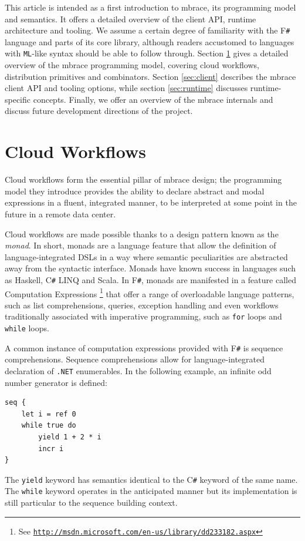 \documentclass[9pt,a4paper]{article}
\newcommand{\mbrace}{mbrace}
\newcommand{\fsharp}{F\texttt \#}
\newcommand{\csharp}{C\texttt \#}
\newcommand{\dotnet}{\texttt{\hbox{.}NET}}
\newcommand{\samehref}[1]{\href{#1}{\texttt{#1}}}
\begin{document}
This article is intended as a first introduction to \mbrace{}, its programming model and semantics.
It offers a detailed overview of the client API, runtime architecture and tooling.
We assume a certain degree of familiarity with the \fsharp{} language and parts
of its core library, although readers accustomed to languages with \texttt{ML}-like syntax
should be able to follow through.
Section \ref{sec:workflows} gives a detailed overview of the \mbrace{} programming model,
covering cloud workflows, distribution primitives and combinators.
Section \ref{sec:client} describes the \mbrace{} client API and tooling options,
while section \ref{sec:runtime} discusses runtime-specific concepts.
Finally, we offer an overview of the \mbrace{} internals and discuss future
development directions of the project.
%


%
%

\section{Cloud Workflows}%
\label{sec:workflows}
%
Cloud workflows form the essential pillar of \mbrace{} design;
the programming model they introduce provides the ability to declare abstract
and modal expressions in a fluent, integrated manner, to be interpreted 
at some point in the future in a remote data center.

Cloud workflows are made possible thanks to a design pattern known as the \emph{monad}.
In short, monads are a language feature that allow the definition of language-integrated 
DSLs in a way where semantic peculiarities are abstracted away from the syntactic interface.
Monads have known success in languages such as Haskell, \csharp{} LINQ and Scala. 
In \fsharp, monads are manifested in a feature called 
Computation Expressions%
\footnote{See \samehref{http://msdn.microsoft.com/en-us/library/dd233182.aspx}}
that offer a range of overloadable language patterns, such as list comprehensions, 
queries, exception handling and even workflows traditionally associated with 
imperative programming, such as \texttt{for} loops and \texttt{while} loops.

A common instance of computation expressions provided with \fsharp{} is 
sequence comprehensions. Sequence comprehensions allow for language-integrated declaration 
of \dotnet{} enumerables. In the following example, an infinite odd number generator is 
defined:
\begin{lstlisting}
seq {
    let i = ref 0
    while true do
        yield 1 + 2 * i
        incr i
}
\end{lstlisting}
The \texttt{yield} keyword has semantics identical to the \csharp{} keyword of the same 
name. The \texttt{while} keyword operates in the anticipated manner but its implementation
is still particular to the sequence building context.
\end{document}
